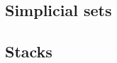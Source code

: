 \subsection{Simplicial sets}
\label{sec:simplicial-sets}

\subsection{Stacks}
\label{sec:stacks}



